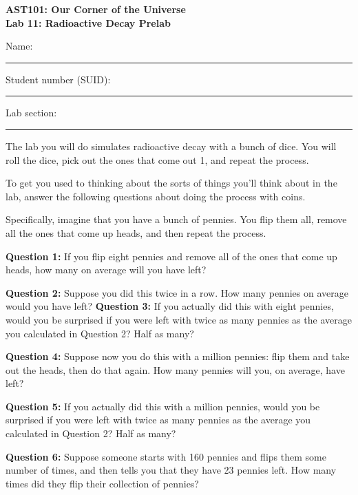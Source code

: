 \documentclass[11pt]{article}
\begin{document}
\begin{center}
\textbf{\Large
AST101: Our Corner of the Universe \\
\vspace*{0.1cm}
Lab 11: Radioactive Decay Prelab
}
\end{center}

\vspace*{0.5cm}

{\Large Name:}\vspace*{0.5cm}\\\hrule
{\Large Student number (SUID):}\vspace*{0.5cm}\\\hrule
{\Large Lab section:}\vspace*{0.5cm}\\\hrule
\vspace*{0.5cm}


The lab you will do simulates radioactive decay with a bunch of dice. You will roll the dice, pick out the ones that come
out 1, and repeat the process.

To get you used to thinking about the sorts of things you'll think about in the lab, answer the following questions
about doing the process with coins.

Specifically, imagine that you have a bunch of pennies. You flip them all, remove all the ones that come up heads, and 
then repeat the process.

{\bf Question 1:} If you flip eight pennies and remove all of the ones that come up heads, how many on average will you have
left?

\vspace{2in}

{\bf Question 2:} Suppose you did this twice in a row. How many pennies on average would you have left?
\vspace{2in}
\newpage
{\bf Question 3:} If you actually did this with eight pennies, would you be surprised if you were left with twice as many pennies as the average you calculated in Question 2? Half as many? 

\vspace{2in}

{\bf Question 4:} Suppose now you do this with a million pennies: flip them and take out the heads, then do that again. 
How many pennies will you, on average, have left?

\vspace{2in}

{\bf Question 5:} If you actually did this with a million pennies, would you be surprised if you were left with twice as many pennies as the average you calculated in Question 2? Half as many? 

\vspace{2in}

{\bf Question 6:} Suppose someone starts with 160 pennies and flips them some number of times, and then tells you that they
have 23 pennies left. How many times did they flip their collection of pennies?
\end{document}
